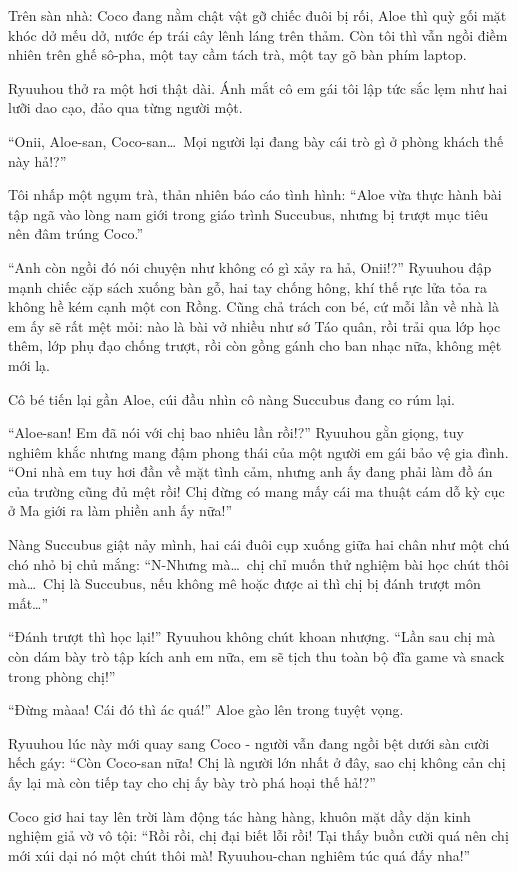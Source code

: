 \documentclass[../main.tex]{subfiles}
\begin{document}
Trên sàn nhà: Coco đang nằm chật vật gỡ chiếc đuôi bị rối, Aloe thì quỳ gối mặt khóc dở mếu dở, nước ép trái cây lênh láng trên thảm. Còn tôi thì vẫn ngồi điềm nhiên trên ghế sô-pha, một tay cầm tách trà, một tay gõ bàn phím laptop.

Ryuuhou thở ra một hơi thật dài. Ánh mắt cô em gái tôi lập tức sắc lẹm như hai lưỡi dao cạo, đảo qua từng người một.

``Onii, Aloe-san, Coco-san\dots\ Mọi người lại đang bày cái trò gì ở phòng khách thế này hả!?''

Tôi nhấp một ngụm trà, thản nhiên báo cáo tình hình: ``Aloe vừa thực hành bài tập ngã vào lòng nam giới trong giáo trình Succubus, nhưng bị trượt mục tiêu nên đâm trúng Coco.''

``Anh còn ngồi đó nói chuyện như không có gì xảy ra hả, Onii!?'' Ryuuhou đập mạnh chiếc cặp sách xuống bàn gỗ, hai tay chống hông, khí thế rực lửa tỏa ra không hề kém cạnh một con Rồng.  Cũng chả trách con bé, cứ mỗi lần về nhà là em ấy sẽ rất mệt mỏi: nào là bài vở nhiều như sớ Táo quân, rồi trải qua lớp học thêm, lớp phụ đạo chống trượt, rồi còn gồng gánh cho ban nhạc nữa, không mệt mới lạ.

Cô bé tiến lại gần Aloe, cúi đầu nhìn cô nàng Succubus đang co rúm lại.

``Aloe-san! Em đã nói với chị bao nhiêu lần rồi!?'' Ryuuhou gằn giọng, tuy nghiêm khắc nhưng mang đậm phong thái của một người em gái bảo vệ gia đình. ``Oni nhà em tuy hơi đần về mặt tình cảm, nhưng anh ấy đang phải làm đồ án của trường cũng đủ mệt rồi! Chị đừng có mang mấy cái ma thuật cám dỗ kỳ cục ở Ma giới ra làm phiền anh ấy nữa!''

Nàng Succubus giật nảy mình, hai cái đuôi cụp xuống giữa hai chân như một chú chó nhỏ bị chủ mắng: ``N-Nhưng mà\dots\ chị chỉ muốn thử nghiệm bài học chút thôi mà\dots\ Chị là Succubus, nếu không mê hoặc được ai thì chị bị đánh trượt môn mất\dots''

``Đánh trượt thì học lại!'' Ryuuhou không chút khoan nhượng. ``Lần sau chị mà còn dám bày trò tập kích anh em nữa, em sẽ tịch thu toàn bộ đĩa game và snack trong phòng chị!''

``Đừng màaa! Cái đó thì ác quá!'' Aloe gào lên trong tuyệt vọng.

Ryuuhou lúc này mới quay sang Coco - người vẫn đang ngồi bệt dưới sàn cười hếch gáy: ``Còn Coco-san nữa! Chị là người lớn nhất ở đây, sao chị không cản chị ấy lại mà còn tiếp tay cho chị ấy bày trò phá hoại thế hả!?''

Coco giơ hai tay lên trời làm động tác hàng hàng, khuôn mặt dầy dặn kinh nghiệm giả vờ vô tội: ``Rồi rồi, chị đại biết lỗi rồi! Tại thấy buồn cười quá nên chị mới xúi dại nó một chút thôi mà! Ryuuhou-chan nghiêm túc quá đấy nha!''
\end{document}
